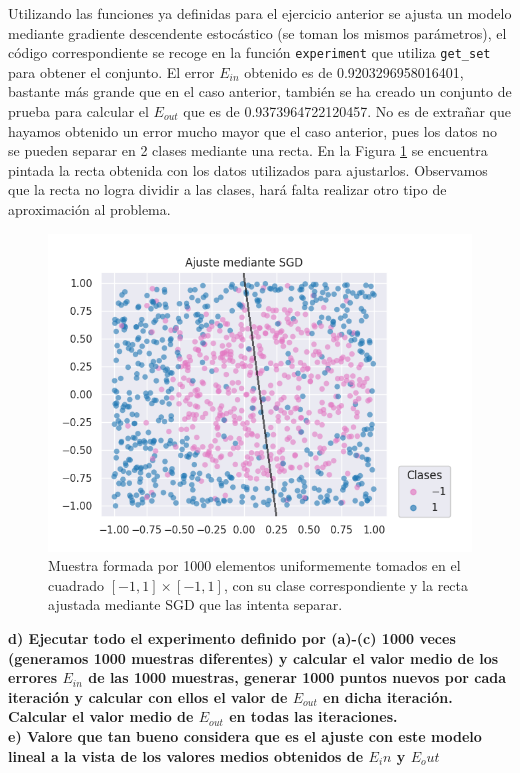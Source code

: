 \documentclass[a4paper, 20pt]{article}
\begin{document}
Utilizando las funciones ya definidas para el ejercicio anterior se ajusta un modelo mediante gradiente descendente estocástico (se toman los mismos parámetros), el código correspondiente se recoge en la función \texttt{experiment} que utiliza \texttt{get\_set} para obtener el conjunto. El error $E_{in}$ obtenido es de 0.9203296958016401, bastante más grande que en el caso anterior, también se ha creado un conjunto de prueba para calcular el $E_{out}$ que es de 0.9373964722120457. No es de extrañar que hayamos obtenido un error mucho mayor que el caso anterior, pues los datos no se pueden separar en 2 clases mediante una recta. En la Figura \ref{fig:22c} se encuentra pintada la recta obtenida con los datos utilizados para ajustarlos. Observamos que la recta no logra dividir a las clases, hará falta realizar otro tipo de aproximación al problema.

\begin{figure}[H]
    \centering
    \includegraphics[width=1\textwidth]{results22}
    \caption{Muestra formada por 1000 elementos uniformemente tomados en el cuadrado $[-1,1]\times[-1,1]$, con su clase correspondiente y la recta ajustada mediante SGD que las intenta separar.}
    \label{fig:22c}
\end{figure}

\textbf{d) Ejecutar todo el experimento definido por (a)-(c) 1000 veces (generamos 1000 muestras diferentes) y calcular el valor medio de los errores $E_{in}$ de las 1000 muestras, generar 1000 puntos nuevos por cada iteración y calcular con ellos el valor de $E_{out}$ en dicha iteración. Calcular el valor medio de $E_{out}$ en todas las iteraciones.\\ 
e) Valore que tan bueno considera que es el ajuste con este modelo lineal a la vista de los valores medios obtenidos de $E_in$ y $E_out$}
\end{document}
